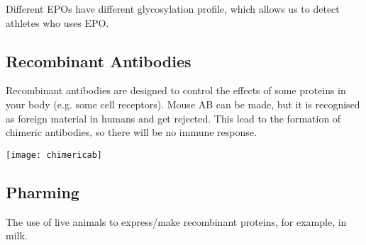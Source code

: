 Different EPOs have different glycosylation profile, which allows us to detect athletes who uses EPO.

\subsection{Recombinant Antibodies}

Recombinant antibodies are designed to control the effects of some proteins in your body (e.g. some cell receptors).
Mouse AB can be made, but it is recognised as foreign material in humans and get rejected.
This lead to the formation of chimeric antibodies, so there will be no immune response.

\begin{center}
\texttt{[image: chimericab]}
\end{center}

\subsection{Pharming}

The use of live animals to express/make recombinant proteins, for example, in milk.

